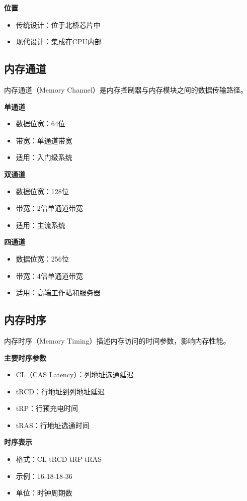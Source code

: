 \documentclass{article}
\begin{document}
\textbf{位置}
\begin{itemize}
    \item 传统设计：位于北桥芯片中
    \item 现代设计：集成在CPU内部
\end{itemize}

\subsection{内存通道}

内存通道（Memory Channel）是内存控制器与内存模块之间的数据传输路径。

\textbf{单通道}
\begin{itemize}
    \item 数据位宽：64位
    \item 带宽：单通道带宽
    \item 适用：入门级系统
\end{itemize}

\textbf{双通道}
\begin{itemize}
    \item 数据位宽：128位
    \item 带宽：2倍单通道带宽
    \item 适用：主流系统
\end{itemize}

\textbf{四通道}
\begin{itemize}
    \item 数据位宽：256位
    \item 带宽：4倍单通道带宽
    \item 适用：高端工作站和服务器
\end{itemize}

\subsection{内存时序}

内存时序（Memory Timing）描述内存访问的时间参数，影响内存性能。

\textbf{主要时序参数}
\begin{itemize}
    \item CL（CAS Latency）：列地址选通延迟
    \item tRCD：行地址到列地址延迟
    \item tRP：行预充电时间
    \item tRAS：行地址选通时间
\end{itemize}

\textbf{时序表示}
\begin{itemize}
    \item 格式：CL-tRCD-tRP-tRAS
    \item 示例：16-18-18-36
    \item 单位：时钟周期数
\end{itemize}
\end{document}
